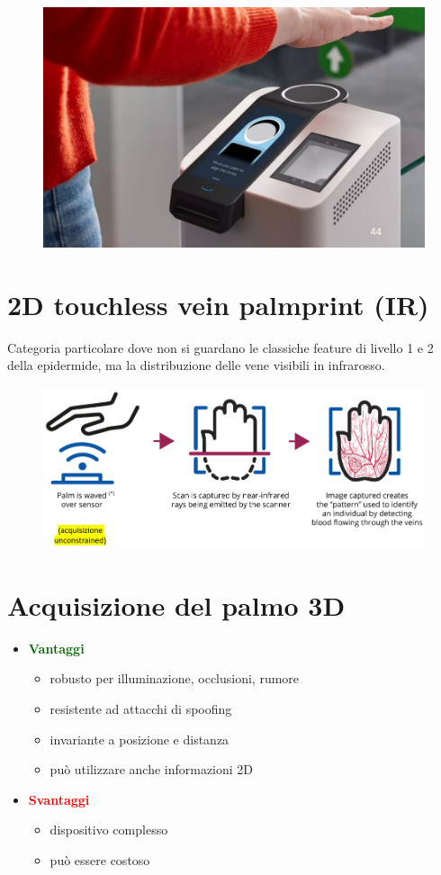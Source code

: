 \documentclass{report}
\begin{document}
\begin{figure}[ht]
    \centering
    \includegraphics[width=0.7\linewidth]{images/palm-touchless-2d.png}
\end{figure}


\section{2D touchless vein palmprint (IR)} 

Categoria particolare dove non si guardano le classiche feature di livello
1 e 2 della epidermide, ma la distribuzione delle vene visibili in infrarosso.

\begin{figure}[ht]
    \centering
    \includegraphics[width=1\linewidth]{images/vein.png}
\end{figure}

\newpage
\section{Acquisizione del palmo 3D}

\begin{itemize}
    \item \textcolor{darkgreen}{\textbf{Vantaggi}}
    \begin{itemize}
        \item robusto per illuminazione, occlusioni, rumore 
        \item resistente ad attacchi di spoofing
        \item invariante a posizione e distanza
        \item può utilizzare anche informazioni 2D
    \end{itemize}
    \item \textcolor{red}{\textbf{Svantaggi}}
    \begin{itemize}
        \item dispositivo complesso 
        \item può essere costoso
    \end{itemize}
\end{itemize}
\end{document}
